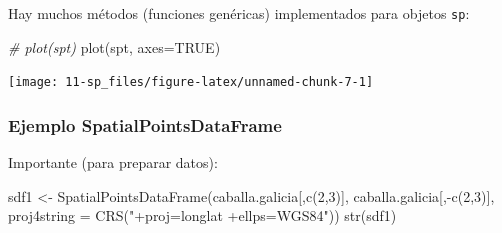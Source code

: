 \documentclass[
  spanish,
]{book}
\newenvironment{Shaded}{\begin{snugshade}}{\end{snugshade}}
\newcommand{\AttributeTok}[1]{\textcolor[rgb]{0.77,0.63,0.00}{#1}}
\newcommand{\CommentTok}[1]{\textcolor[rgb]{0.56,0.35,0.01}{\textit{#1}}}
\newcommand{\ConstantTok}[1]{\textcolor[rgb]{0.00,0.00,0.00}{#1}}
\newcommand{\DecValTok}[1]{\textcolor[rgb]{0.00,0.00,0.81}{#1}}
\newcommand{\FunctionTok}[1]{\textcolor[rgb]{0.00,0.00,0.00}{#1}}
\newcommand{\NormalTok}[1]{#1}
\newcommand{\OtherTok}[1]{\textcolor[rgb]{0.56,0.35,0.01}{#1}}
\newcommand{\SpecialCharTok}[1]{\textcolor[rgb]{0.00,0.00,0.00}{#1}}
\newcommand{\StringTok}[1]{\textcolor[rgb]{0.31,0.60,0.02}{#1}}
\theoremstyle{break}
\begin{document}
Hay muchos métodos (funciones genéricas) implementados para objetos \texttt{sp}:

\begin{Shaded}
\begin{Highlighting}[]
\CommentTok{\# plot(spt)}
\FunctionTok{plot}\NormalTok{(spt, }\AttributeTok{axes=}\ConstantTok{TRUE}\NormalTok{)}
\end{Highlighting}
\end{Shaded}

\begin{center}\texttt{[image: 11-sp\_files/figure-latex/unnamed-chunk-7-1]} \end{center}

\hypertarget{ejemplo-spatialpointsdataframe}{%
\subsubsection{Ejemplo SpatialPointsDataFrame}\label{ejemplo-spatialpointsdataframe}}

Importante (para preparar datos):

\begin{Shaded}
\begin{Highlighting}[]
\NormalTok{sdf1 }\OtherTok{\textless{}{-}} \FunctionTok{SpatialPointsDataFrame}\NormalTok{(caballa.galicia[,}\FunctionTok{c}\NormalTok{(}\DecValTok{2}\NormalTok{,}\DecValTok{3}\NormalTok{)], caballa.galicia[,}\SpecialCharTok{{-}}\FunctionTok{c}\NormalTok{(}\DecValTok{2}\NormalTok{,}\DecValTok{3}\NormalTok{)], }\AttributeTok{proj4string =} \FunctionTok{CRS}\NormalTok{(}\StringTok{"+proj=longlat +ellps=WGS84"}\NormalTok{))}
\FunctionTok{str}\NormalTok{(sdf1)}
\end{Highlighting}
\end{Shaded}
\end{document}
